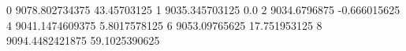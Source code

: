 0 9078.802734375 43.45703125
1 9035.345703125 0.0
2 9034.6796875 -0.666015625
4 9041.1474609375 5.8017578125
6 9053.09765625 17.751953125
8 9094.4482421875 59.1025390625
